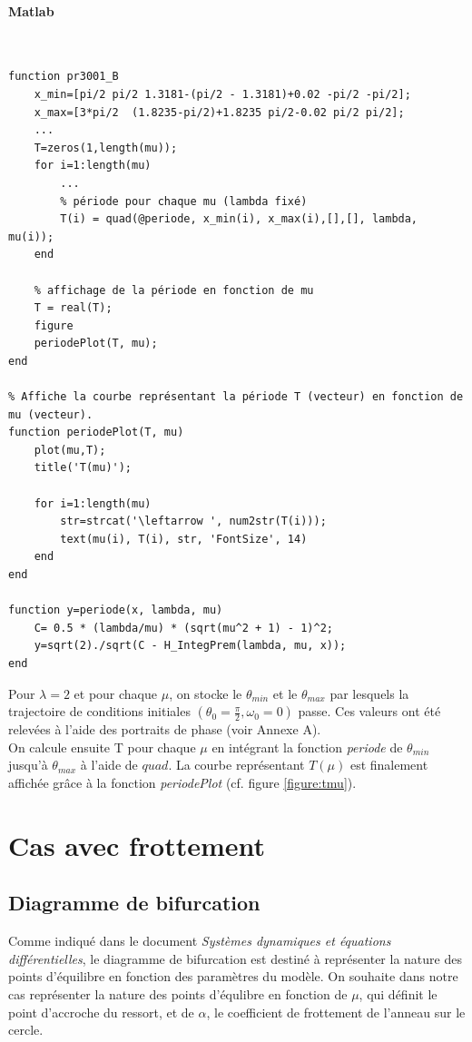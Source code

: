 \documentclass[11pt]{article}
\begin{document}
\paragraph{Matlab}\mbox{}\\
\begin{lstlisting}
function pr3001_B
    x_min=[pi/2 pi/2 1.3181-(pi/2 - 1.3181)+0.02 -pi/2 -pi/2];
    x_max=[3*pi/2  (1.8235-pi/2)+1.8235 pi/2-0.02 pi/2 pi/2];
    ...
    T=zeros(1,length(mu));
    for i=1:length(mu)
    	...
    	% période pour chaque mu (lambda fixé)
    	T(i) = quad(@periode, x_min(i), x_max(i),[],[], lambda, mu(i));
    end

    % affichage de la période en fonction de mu
    T = real(T);
    figure
    periodePlot(T, mu);
end

% Affiche la courbe représentant la période T (vecteur) en fonction de mu (vecteur).
function periodePlot(T, mu)
    plot(mu,T);
    title('T(mu)');

    for i=1:length(mu)
        str=strcat('\leftarrow ', num2str(T(i)));
        text(mu(i), T(i), str, 'FontSize', 14)
    end
end

function y=periode(x, lambda, mu)
    C= 0.5 * (lambda/mu) * (sqrt(mu^2 + 1) - 1)^2;
    y=sqrt(2)./sqrt(C - H_IntegPrem(lambda, mu, x));
end
\end{lstlisting}
Pour $\lambda=2$ et pour chaque $\mu$, on stocke le $\theta_{min}$ et le $\theta_{max}$ par lesquels la trajectoire de conditions initiales $(\theta_0=\frac{\pi}{2}, \omega_0=0)$ passe. Ces valeurs ont été relevées à l'aide des portraits de phase (voir Annexe A).\\

On calcule ensuite T pour chaque $\mu$ en intégrant la fonction \emph{periode} de $\theta_{min}$ jusqu'à $\theta_{max}$ à l'aide de $quad$. La courbe représentant $T(\mu)$ est finalement affichée grâce à la fonction \emph{periodePlot} (cf. figure \ref{figure:tmu}).
\newpage

\section{Cas avec frottement}
\subsection{Diagramme de bifurcation}
Comme indiqué dans le document \emph{Systèmes dynamiques et équations différentielles}, le diagramme de bifurcation est destiné à représenter la nature des points d'équilibre en fonction des paramètres du modèle. On souhaite dans notre cas représenter la nature des points d'équlibre en fonction de $\mu$, qui définit le point d'accroche du ressort, et de $\alpha$, le coefficient de frottement de l'anneau sur le cercle.
\end{document}
